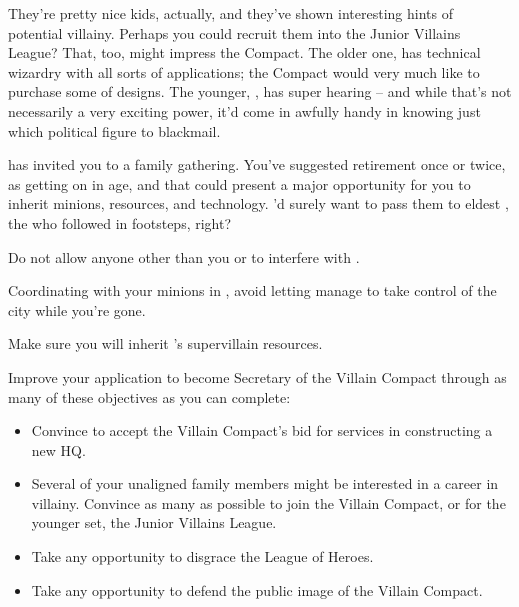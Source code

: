 \documentclass[char]{LRSguildcamp1}
\begin{document}
They're pretty nice kids, actually, and they've shown interesting hints of potential villainy.  Perhaps you could recruit them into the Junior Villains League?  That, too, might impress the Compact.  The older one, \cTeen{} has technical wizardry with all sorts of applications; the Compact would very much like to purchase some of \cTeen{\their} designs.  The younger, \cTween{}, has super hearing -- and while that's not necessarily a very exciting power, it'd come in awfully handy in knowing just which political figure to blackmail.

\cGrandma{} has invited you to a family gathering.  You've suggested retirement once or twice, as \cGrandma{\theyare} getting on in age, and that could present a major opportunity for you to inherit \cGrandma{\their} minions, resources, and technology.  \cGrandma{\They}'d surely want to pass them to \cGrandma{\their} eldest \cOldest{\offspring}, the \cOldest{\villain} who followed in \cGrandma{\their} footsteps,  right?

\begin{itemz}[Goals]
	\item Do not allow anyone other than you or \cOS{} to interfere with \pCityO{}.  %
	\item Coordinating with your minions in \pCityO{}, avoid letting \cOS{} manage to take control of the city while you're gone.
	\item Make sure you will inherit \cGrandma{}'s supervillain resources. %
	\item Improve your application to become Secretary of the Villain Compact through as many of these objectives as you can complete:
	\begin{itemize}
		\item Convince \cArchitect{} to accept the Villain Compact's bid for \cArchitect{\their} services in constructing a new HQ.
		\item Several of your unaligned family members might be interested in a career in villainy.  Convince as many as possible to join the Villain Compact, or for the younger set, the Junior Villains League.
		\item Take any opportunity to disgrace the League of Heroes.
		\item Take any opportunity to defend the public image of the Villain Compact.  %
	\end{itemize}
\end{itemz}
\end{document}
